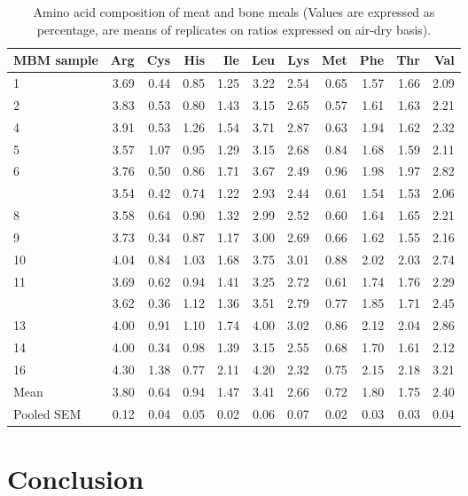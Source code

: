 \documentclass[
]{article}
\begin{document}
\begin{longtable}[t]{lrrrrrrrrrr}
\caption{\label{tab:amino-acids-mbm}Amino acid composition of meat and bone meals (Values are expressed as percentage, are means of replicates on ratios expressed on air-dry basis).}\\
\toprule
MBM sample & Arg & Cys & His & Ile & Leu & Lys & Met & Phe & Thr & Val\\
\midrule
1 & 3.69 & 0.44 & 0.85 & 1.25 & 3.22 & 2.54 & 0.65 & 1.57 & 1.66 & 2.09\\
2 & 3.83 & 0.53 & 0.80 & 1.43 & 3.15 & 2.65 & 0.57 & 1.61 & 1.63 & 2.21\\
4 & 3.91 & 0.53 & 1.26 & 1.54 & 3.71 & 2.87 & 0.63 & 1.94 & 1.62 & 2.32\\
5 & 3.57 & 1.07 & 0.95 & 1.29 & 3.15 & 2.68 & 0.84 & 1.68 & 1.59 & 2.11\\
6 & 3.76 & 0.50 & 0.86 & 1.71 & 3.67 & 2.49 & 0.96 & 1.98 & 1.97 & 2.82\\
\addlinespace
7 & 3.54 & 0.42 & 0.74 & 1.22 & 2.93 & 2.44 & 0.61 & 1.54 & 1.53 & 2.06\\
8 & 3.58 & 0.64 & 0.90 & 1.32 & 2.99 & 2.52 & 0.60 & 1.64 & 1.65 & 2.21\\
9 & 3.73 & 0.34 & 0.87 & 1.17 & 3.00 & 2.69 & 0.66 & 1.62 & 1.55 & 2.16\\
10 & 4.04 & 0.84 & 1.03 & 1.68 & 3.75 & 3.01 & 0.88 & 2.02 & 2.03 & 2.74\\
11 & 3.69 & 0.62 & 0.94 & 1.41 & 3.25 & 2.72 & 0.61 & 1.74 & 1.76 & 2.29\\
\addlinespace
12 & 3.62 & 0.36 & 1.12 & 1.36 & 3.51 & 2.79 & 0.77 & 1.85 & 1.71 & 2.45\\
13 & 4.00 & 0.91 & 1.10 & 1.74 & 4.00 & 3.02 & 0.86 & 2.12 & 2.04 & 2.86\\
14 & 4.00 & 0.34 & 0.98 & 1.39 & 3.15 & 2.55 & 0.68 & 1.70 & 1.61 & 2.12\\
16 & 4.30 & 1.38 & 0.77 & 2.11 & 4.20 & 2.32 & 0.75 & 2.15 & 2.18 & 3.21\\
Mean & 3.80 & 0.64 & 0.94 & 1.47 & 3.41 & 2.66 & 0.72 & 1.80 & 1.75 & 2.40\\
\addlinespace
Pooled SEM & 0.12 & 0.04 & 0.05 & 0.02 & 0.06 & 0.07 & 0.02 & 0.03 & 0.03 & 0.04\\
\bottomrule
\end{longtable}

\hypertarget{conclusion}{%
\section{Conclusion}\label{conclusion}}
\end{document}
